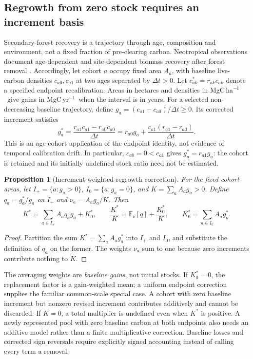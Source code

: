 \documentclass[11pt,a4paper]{article}
\newcommand{\E}{\mathbb{E}}
\newtheorem{proposition}{Proposition}[section]
\theoremstyle{remark}
\begin{document}
\subsection{Regrowth from zero stock requires an increment basis}\label{sec:regrowth}
Secondary-forest recovery is a trajectory through age, composition and environment, not a fixed fraction of pre-clearing carbon. Neotropical observations document age-dependent and site-dependent biomass recovery after forest removal \citep{Poorter2016}. Accordingly, let cohort $a$ occupy fixed area $A_a$, with baseline live-carbon densities $c_{a0},c_{a1}$ at two ages separated by $\Delta t>0$. Let $c^*_{ak}=r_{ak}c_{ak}$ denote a specified endpoint recalibration. Areas in hectares and densities in MgC\,ha$^{-1}$\ give gains in MgC\,yr$^{-1}$\ when the interval is in years. For a selected non-decreasing baseline trajectory, define $g_a=(c_{a1}-c_{a0})/\Delta t\geq0$. Its corrected increment satisfies
\begin{equation}
 g_a^*=\frac{r_{a1}c_{a1}-r_{a0}c_{a0}}{\Delta t}
 =r_{a0}g_a+\frac{c_{a1}(r_{a1}-r_{a0})}{\Delta t}.
 \label{eq:regrowthincrement}
\end{equation}
This is an age-cohort application of the endpoint identity, not evidence of temporal calibration drift. In particular, $c_{a0}=0<c_{a1}$ gives $g_a^*=r_{a1}g_a$: the cohort is retained and its initially undefined stock ratio need not be estimated.

\begin{proposition}[Increment-weighted regrowth correction]\label{prop:regrowth}
For the fixed cohort areas, let $I_+=\{a:g_a>0\}$, $I_0=\{a:g_a=0\}$, and $K=\sum_a A_ag_a>0$. Define $q_a=g_a^*/g_a$ on $I_+$ and $\nu_a=A_ag_a/K$. Then
\begin{equation}
 K^*=\sum_{a\in I_+}A_aq_ag_a+K_0^*,\qquad
 \frac{K^*}{K}=\E_\nu[q]+\frac{K_0^*}{K},\qquad
 K_0^*=\sum_{a\in I_0}A_ag_a^*.
 \label{eq:regrowthaggregation}
\end{equation}
\end{proposition}
\begin{proof}
Partition the sum $K^*=\sum_a A_ag_a^*$ into $I_+$ and $I_0$, and substitute the definition of $q_a$ on the former. The weights $\nu_a$ sum to one because zero increments contribute nothing to $K$.
\end{proof}
The averaging weights are \emph{baseline gains}, not initial stocks. If $K_0^*=0$, the replacement factor is a gain-weighted mean; a uniform endpoint correction supplies the familiar common-scale special case. A cohort with zero baseline increment but nonzero revised increment contributes additively and cannot be discarded. If $K=0$, a total multiplier is undefined even when $K^*$ is positive. A newly represented pool with zero baseline carbon at both endpoints also needs an additive model rather than a finite multiplicative correction. Baseline losses and corrected sign reversals require explicitly signed accounting instead of calling every term a removal.
\end{document}

